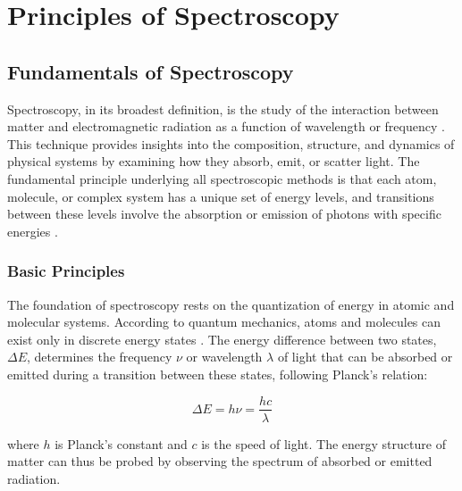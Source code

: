 \chapter{Principles of Spectroscopy}
\label{chapter_spectroscopy}

\section{Fundamentals of Spectroscopy}
\label{sec:spectroscopy_fundamentals}

\noindent Spectroscopy, in its broadest definition, is the study of the interaction between matter and electromagnetic radiation as a function of wavelength or frequency \cite{berman2011principleslaserspectroscopy, mukamel1995principlesnonlinearoptical}.
This technique provides insights into the composition, structure, and dynamics of physical systems by examining how they absorb, emit, or scatter light. The fundamental principle underlying all spectroscopic methods is that each atom, molecule, or complex system has a unique set of energy levels, and transitions between these levels involve the absorption or emission of photons with specific energies \cite{boyd2008chapter1nonlinear}.

\subsection{Basic Principles}
\label{subsec:basic_principles}

\noindent The foundation of spectroscopy rests on the quantization of energy in atomic and molecular systems. According to quantum mechanics, atoms and molecules can exist only in discrete energy states \cite{albashetal2012quantumadiabaticmarkovian}. The energy difference between two states, $\Delta E$, determines the frequency $\nu$ or wavelength $\lambda$ of light that can be absorbed or emitted during a transition between these states, following Planck's relation:

\begin{equation}
	\Delta E = h\nu = \frac{hc}{\lambda}
	\label{eq:planck_relation}
\end{equation}

\noindent where $h$ is Planck's constant and $c$ is the speed of light. The energy structure of matter can thus be probed by observing the spectrum of absorbed or emitted radiation.

